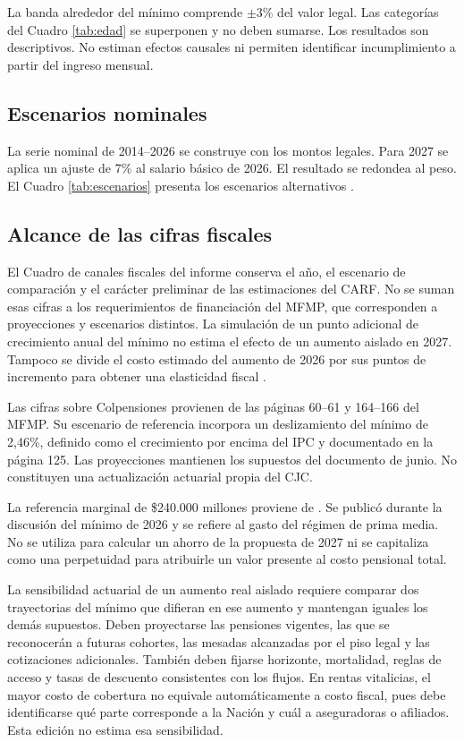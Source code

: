 La banda alrededor del mínimo comprende $\pm3\%$ del valor legal. Las categorías del Cuadro \ref{tab:edad} se superponen y no deben sumarse. Los resultados son descriptivos. No estiman efectos causales ni permiten identificar incumplimiento a partir del ingreso mensual.



\subsection{Escenarios nominales}

La serie nominal de 2014--2026 se construye con los montos legales. Para 2027 se aplica un ajuste de 7\% al salario básico de 2026. El resultado se redondea al peso. El Cuadro \ref{tab:escenarios} presenta los escenarios alternativos \citep{salarioHistorico,decreto1785,decreto2613,decreto2024,decreto2025,decreto2026}.






\subsection{Alcance de las cifras fiscales}

El Cuadro de canales fiscales del informe conserva el año, el escenario de comparación y el carácter preliminar de las estimaciones del CARF. No se suman esas cifras a los requerimientos de financiación del MFMP, que corresponden a proyecciones y escenarios distintos. La simulación de un punto adicional de crecimiento anual del mínimo no estima el efecto de un aumento aislado en 2027. Tampoco se divide el costo estimado del aumento de 2026 por sus puntos de incremento para obtener una elasticidad fiscal \citep{carf22,mfmp2026}.

Las cifras sobre Colpensiones provienen de las páginas 60--61 y 164--166 del MFMP. Su escenario de referencia incorpora un deslizamiento del mínimo de 2,46\%, definido como el crecimiento por encima del IPC y documentado en la página 125. Las proyecciones mantienen los supuestos del documento de junio. No constituyen una actualización actuarial propia del CJC.

La referencia marginal de \$240.000 millones proviene de \citet{anifCosto2025}. Se publicó durante la discusión del mínimo de 2026 y se refiere al gasto del régimen de prima media. No se utiliza para calcular un ahorro de la propuesta de 2027 ni se capitaliza como una perpetuidad para atribuirle un valor presente al costo pensional total.

La sensibilidad actuarial de un aumento real aislado requiere comparar dos trayectorias del mínimo que difieran en ese aumento y mantengan iguales los demás supuestos. Deben proyectarse las pensiones vigentes, las que se reconocerán a futuras cohortes, las mesadas alcanzadas por el piso legal y las cotizaciones adicionales. También deben fijarse horizonte, mortalidad, reglas de acceso y tasas de descuento consistentes con los flujos. En rentas vitalicias, el mayor costo de cobertura no equivale automáticamente a costo fiscal, pues debe identificarse qué parte corresponde a la Nación y cuál a aseguradoras o afiliados. Esta edición no estima esa sensibilidad.
